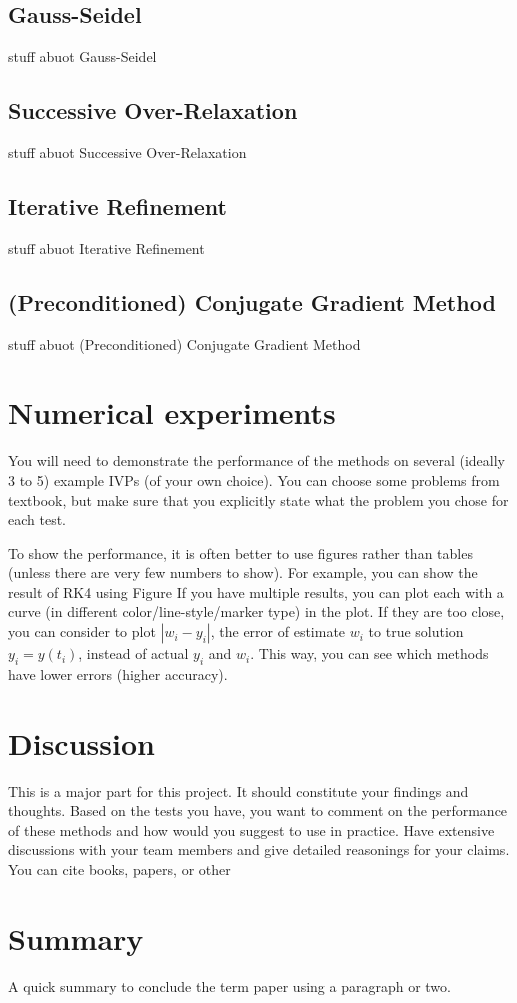 \documentclass[11pt]{article}	%
\begin{document}
\subsection{Gauss-Seidel}
stuff abuot Gauss-Seidel

\subsection{Successive Over-Relaxation}
stuff abuot Successive Over-Relaxation

\subsection{Iterative Refinement}
stuff abuot Iterative Refinement

\subsection{(Preconditioned) Conjugate Gradient Method}
stuff abuot (Preconditioned) Conjugate Gradient Method

\section{Numerical experiments}
You will need to demonstrate the performance
of the methods on several (ideally 3 to 5) example IVPs (of your own choice).
You can choose some problems from textbook, but make sure that you
explicitly state what the problem you chose for each test.

To show the performance, it is often better to use figures
rather than tables (unless there are very few numbers to show).
For example, you can show the result of RK4
using Figure If you have multiple results, you can plot each
with a curve (in different color/line-style/marker type) in the plot. If they are too close, you can consider to
plot $|w_i-y_i|$, the error of estimate $w_i$ to true solution $y_i=y(t_i)$,
instead of actual $y_i$ and $w_i$. This way, you can see which methods have lower errors (higher accuracy).

\section{Discussion}
This is a major part for this project. It should constitute your findings and thoughts.
Based on the tests you have,
you want to comment on the performance of these methods and how would you
suggest to use in practice. Have extensive discussions with your team members
and give detailed reasonings for your claims. You can cite books, papers, or other


\section{Summary}
A quick summary to conclude the term paper using a paragraph or two.
\end{document}
